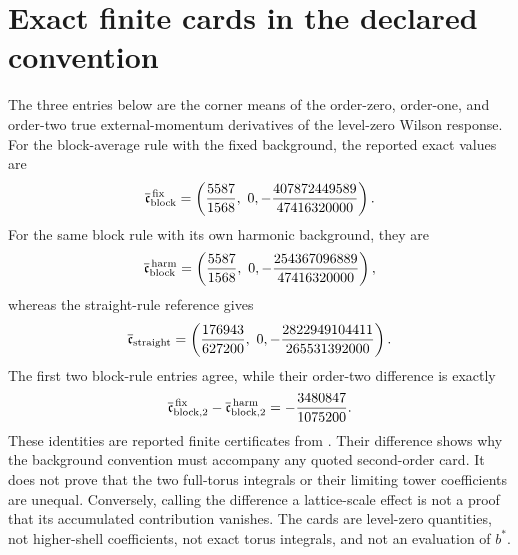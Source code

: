 \documentclass[11pt,oneside,openany]{book}
\theoremstyle{definition}
\theoremstyle{remark}
\newcommand{\src}[2]{\cite[#2]{#1}}
\begin{document}
\section{Exact finite cards in the declared convention}
\label{sec:fixed-background-cards}
The three entries below are the corner means of the order-zero,
order-one, and order-two true external-momentum derivatives of the
level-zero Wilson response. For the block-average rule with the fixed
background, the reported exact values are
\begin{equation}\label{eq:corners-fixed}
\overline{\mathfrak c}^{\,\rm fix}_{\rm block}
=\left(\frac{5587}{1568},\ 0,
-\frac{407872449589}{47416320000}\right).
\end{equation}
For the same block rule with its own harmonic background, they are
\begin{equation}\label{eq:corners}
\overline{\mathfrak c}^{\,\rm harm}_{\rm block}
=\left(\frac{5587}{1568},\ 0,
-\frac{254367096889}{47416320000}\right),
\end{equation}
whereas the straight-rule reference gives
\begin{equation}\label{eq:corners-straight}
\overline{\mathfrak c}_{\rm straight}
=\left(\frac{176943}{627200},\ 0,
-\frac{2822949104411}{265531392000}\right).
\end{equation}
The first two block-rule entries agree, while their order-two difference
is exactly
\begin{equation}\label{eq:background-corner-difference}
\overline{\mathfrak c}^{\,\rm fix}_{{\rm block},2}
-\overline{\mathfrak c}^{\,\rm harm}_{{\rm block},2}
=-\frac{3480847}{1075200}.
\end{equation}
These identities are reported finite certificates from
\src{F11}{V39, V41}. Their difference shows why the background convention
must accompany any quoted second-order card. It does not prove that the
two full-torus integrals or their limiting tower coefficients are unequal.
Conversely, calling the difference a lattice-scale effect is not a proof
that its accumulated contribution vanishes. The cards are level-zero
quantities, not higher-shell coefficients, not exact torus integrals, and
not an evaluation of $b^*$.
\end{document}
